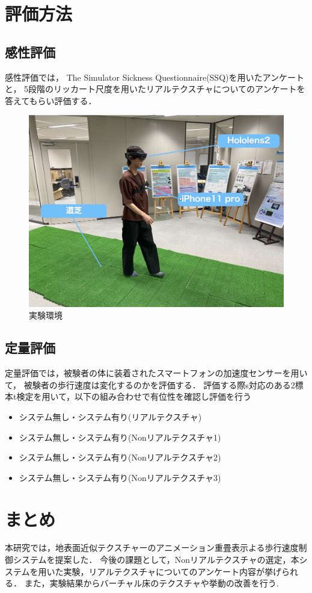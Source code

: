 \documentclass[dvipdfmx]{jsarticle}
\begin{document}
 \section{評価方法}
 
 \subsection{感性評価}
 感性評価では，
The Simulator Sickness Questionnaire(SSQ)を用いたアンケートと，
5段階のリッカート尺度を用いたリアルテクスチャについてのアンケートを答えてもらい評価する．
 
 
 
 \begin{figure}[t]
    \centering
    \includegraphics[width=0.8\linewidth]{fig/enviroment.jpeg}
    \caption{実験環境}
    \label{fig:kokaton}
\end{figure}

\subsection{定量評価}
 定量評価では，被験者の体に装着されたスマートフォンの加速度センサーを用いて，
 被験者の歩行速度は変化するのかを評価する．
評価する際s対応のある2標本t検定を用いて，以下の組み合わせで有位性を確認し評価を行う
\begin{itemize}
    \item システム無し・システム有り(リアルテクスチャ)
    \item システム無し・システム有り(Nonリアルテクスチャ1)
    \item システム無し・システム有り(Nonリアルテクスチャ2)
    \item システム無し・システム有り(Nonリアルテクスチャ3)
\end{itemize}
\section{まとめ}
本研究では，地表面近似テクスチャーのアニメーション重畳表示よる歩行速度制御システムを提案した．
今後の課題として，Nonリアルテクスチャの選定，本システムを用いた実験，リアルテクスチャについてのアンケート内容が挙げられる．
また，実験結果からバーチャル床のテクスチャや挙動の改善を行う.


\end{document}
